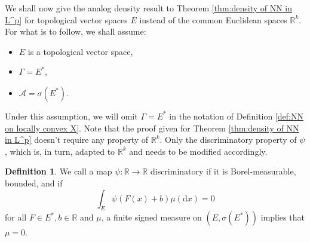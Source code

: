 \documentclass[11pt,a4paper,twoside,openany]{report}
\numberwithin{equation}{section}
\newcommand{\diff}{\mathrm{d}}
\theoremstyle{plain} %
\theoremstyle{definition} %
\newtheorem{definition}[theorem]{Definition}
\theoremstyle{remark} %
\begin{document}
We shall now give the analog density result to Theorem \ref{thm:density of NN in L^p} for topological vector spaces \(E\) instead of the common Euclidean spaces \(\mathbb{R}^k\). For what is to follow, we shall assume:
\begin{itemize}
    \item \(E\) is a topological vector space,
    \item\(\Gamma = E^*\),
    \item\(\mathcal{A}=\sigma(E^*)\).
\end{itemize}
Under this assumption, we will omit \(\Gamma =E^*\) in the notation of Definition \ref{def:NN on locally convex X}.
Note that the proof given for Theorem \ref{thm:density of NN in L^p} doesn't require any property of \(\mathbb{R}^k\). Only the discriminatory property of \(\psi\), which is, in turn, adapted to \(\mathbb{R}^k\) and needs to be modified accordingly.
\begin{definition}\label{def:discriminatory property of X}
 We call a map \(\psi:\mathbb{R}\to\mathbb{R}\) discriminatory if it is Borel-measurable, bounded, and if
    \begin{equation*}
        \int_{E}\psi(F(x)+b)\mu(\diff x)=0
    \end{equation*}
    for all \(F\in E^*,b\in\mathbb{R}\) and \(\mu\), a finite signed measure on \((E,\sigma(E^*))\) implies that \(\mu=0\).    
\end{definition}
\end{document}
